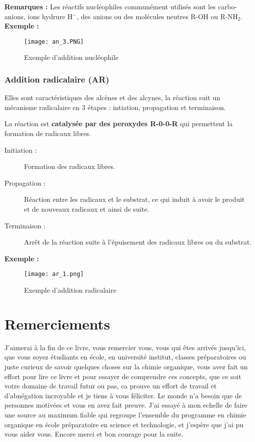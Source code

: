 \documentclass[a4paper, oneside]{book}
\begin{document}
\textbf{Remarques :} Les réactifs nucléophiles communément utilisés sont les carbo-anions, ions hydrure H$^-$, des anions ou des molécules neutres R-OH ou R-NH$_2$.\\
\textbf{Exemple :}
\begin{figure}[!h]
    \centering
    \texttt{[image: an\_3.PNG]}
    \caption{Exemple d'addition nucléophile}
    \label{fig:my_label}
\end{figure}
\newpage
\section{Addition radicalaire (AR)}
Elles sont caractéristiques des alcènes et des alcynes, la réaction suit un mécanisme radicalaire en 3 étapes : intiation, propagation et terminaison.

La réaction est \textbf{catalysée par des peroxydes R-0-0-R} qui permettent la formation de radicaux libres.
\begin{description}
    \item[Initiation :] Formation des radicaux libres.
    \item[Propagation :] Réaction entre les radicaux et le substrat, ce qui induit à avoir le produit et de nouveaux radicaux et ainsi de suite.
    \item[Terminaison :] Arrêt de la réaction suite à l'épuisement des radicaux libres ou du substrat.
\end{description}
\textbf{Exemple :}
\begin{figure}[!h]
    \centering
    \texttt{[image: ar\_1.png]}
    \caption{Exemple d'addition radicalaire}
    \label{fig:my_label}
\end{figure}
\part{Remerciements}
\Large
\vspace*{8cm}
J'aimerai à la fin de ce livre, vous remercier vous, vous qui êtes arrivés jusqu'ici, que vous soyez étudiants en école, en université institut, classes préparatoires ou juste curieux de savoir quelques choses sur la chimie organique, vous avez fait un effort pour lire ce livre et pour essayer de comprendre ces concepts, que ce soit votre domaine de travail futur ou pas, ca prouve un effort de travail et d'abnégation incroyable et je tiens à vous féliciter. Le monde n'a besoin que de personnes motivées et vous en avez fait preuve. J'ai essayé à mon echelle de faire une source au maximum fiable qui regroupe l'ensemble du programme en chimie organique en école préparatoire en science et technologie, et j'espère que j'ai pu vous aider vous. Encore merci et bon courage pour la suite.
\end{document}
